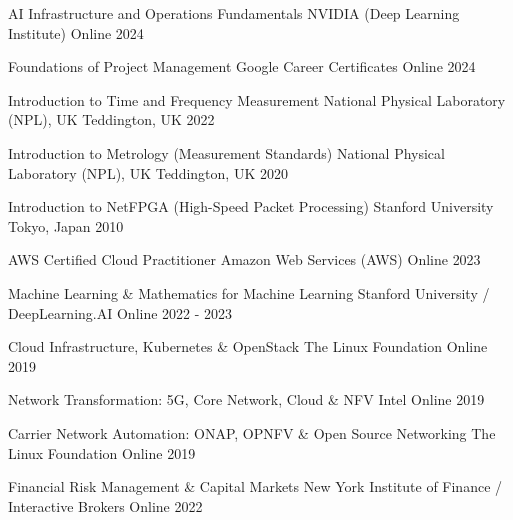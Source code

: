 

\begin{cvhonors}

  \cvhonor
    {AI Infrastructure and Operations Fundamentals} %
    {NVIDIA (Deep Learning Institute)} %
    {Online} %
    {2024} %

  \cvhonor
    {Foundations of Project Management} %
    {Google Career Certificates} %
    {Online} %
    {2024} %

  \cvhonor
    {Introduction to Time and Frequency Measurement} %
    {National Physical Laboratory (NPL), UK} %
    {Teddington, UK} %
    {2022} %

  \cvhonor
    {Introduction to Metrology (Measurement Standards)} %
    {National Physical Laboratory (NPL), UK} %
    {Teddington, UK} %
    {2020} %

  \cvhonor
    {Introduction to NetFPGA (High-Speed Packet Processing)} %
    {Stanford University} %
    {Tokyo, Japan} %
    {2010} %

  \cvhonor
    {AWS Certified Cloud Practitioner} %
    {Amazon Web Services (AWS)} %
    {Online} %
    {2023} %

  \cvhonor
    {Machine Learning \& Mathematics for Machine Learning} %
    {Stanford University / DeepLearning.AI} %
    {Online} %
    {2022 - 2023} %

  \cvhonor
    {Cloud Infrastructure, Kubernetes \& OpenStack} %
    {The Linux Foundation} %
    {Online} %
    {2019} %

  \cvhonor
    {Network Transformation: 5G, Core Network, Cloud \& NFV} %
    {Intel} %
    {Online} %
    {2019} %

  \cvhonor
    {Carrier Network Automation: ONAP, OPNFV \& Open Source Networking} %
    {The Linux Foundation} %
    {Online} %
    {2019} %

  \cvhonor
    {Financial Risk Management \& Capital Markets} %
    {New York Institute of Finance / Interactive Brokers} %
    {Online} %
    {2022} %

\end{cvhonors}
